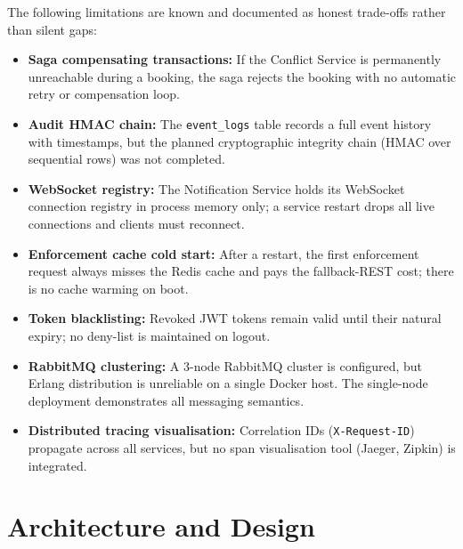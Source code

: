 \documentclass[11pt,a4paper]{article}
\begin{document}
The following limitations are known and documented as honest trade-offs rather than silent gaps:

\begin{itemize}
    \item \textbf{Saga compensating transactions:} If the Conflict Service is permanently unreachable during a booking, the saga rejects the booking with no automatic retry or compensation loop.
    \item \textbf{Audit HMAC chain:} The \texttt{event\_logs} table records a full event history with timestamps, but the planned cryptographic integrity chain (HMAC over sequential rows) was not completed.
    \item \textbf{WebSocket registry:} The Notification Service holds its WebSocket connection registry in process memory only; a service restart drops all live connections and clients must reconnect.
    \item \textbf{Enforcement cache cold start:} After a restart, the first enforcement request always misses the Redis cache and pays the fallback-REST cost; there is no cache warming on boot.
    \item \textbf{Token blacklisting:} Revoked JWT tokens remain valid until their natural expiry; no deny-list is maintained on logout.
    \item \textbf{RabbitMQ clustering:} A 3-node RabbitMQ cluster is configured, but Erlang distribution is unreliable on a single Docker host. The single-node deployment demonstrates all messaging semantics.
    \item \textbf{Distributed tracing visualisation:} Correlation IDs (\texttt{X-Request-ID}) propagate across all services, but no span visualisation tool (Jaeger, Zipkin) is integrated.
\end{itemize}

\section{Architecture and Design}
\label{sec:architecture}
 
\end{document}
